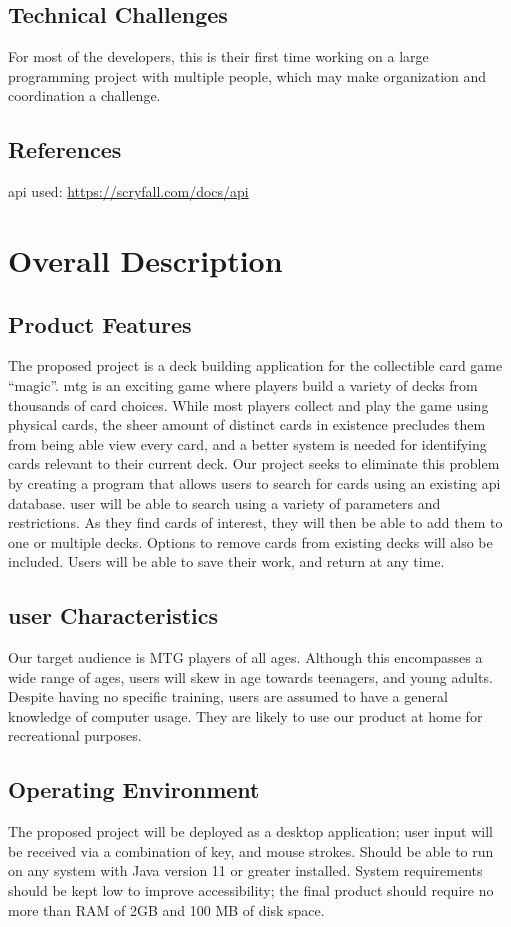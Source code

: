 \documentclass[12pt]{report}
\newcommand{\javaversion}{11 }
\begin{document}
\section{Technical Challenges}
For most of the developers, this is their first time working on a large programming project with multiple people, which may make organization and coordination a challenge.
\section{References}
\acrshort{api} used: \url{https://scryfall.com/docs/api}
\chapter{Overall Description}
\section{Product Features}
The proposed project is a deck building application for the collectible card game “\Gls{magic}”.  \acrshort{mtg} is an exciting game where players build a variety of decks from thousands of card choices. While most players collect and play the game using physical cards, the sheer amount of distinct cards in existence precludes them from being able view every card, and a better system is needed for identifying cards relevant to their current deck. Our project seeks to eliminate this problem by creating a program that allows users to search for cards using an existing \acrshort{api} database. \Gls{user} will be able to search using a variety of parameters and restrictions. As they find cards of interest, they will then be able to add them to one or multiple decks. Options to remove cards from existing decks will also be included. Users will be able to save their work, and return at any time.
\section{\Gls{user} Characteristics}
Our target audience is MTG players of all ages. Although this encompasses a wide range of ages, users will skew in age towards teenagers, and young adults. Despite having no specific training, users are assumed to have a general knowledge of computer usage. They are likely to use our product at home for recreational purposes.
\section{Operating Environment}
The proposed project will be deployed as a desktop application; user input will be received via a combination of key, and mouse strokes. Should be able to run on any system with Java version \javaversion or greater installed. System requirements should be kept low to improve accessibility; the final product should require no more than RAM of 2GB and 100 MB of disk space.
\end{document}
